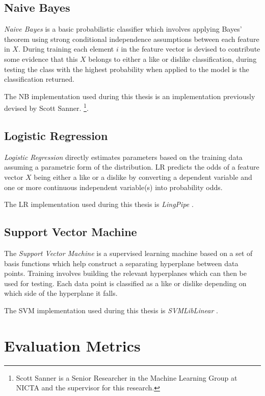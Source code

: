 \subsection{Naive Bayes}
\label{sec:nb}

\emph{Naive Bayes} is a basic probabilistic classifier which involves applying Bayes' theorem using strong conditional independence 
assumptions between each feature in $X$. During training each element $i$ in the feature vector is devised to contribute some 
evidence that this $X$ belongs to either a like or dislike classification, during testing the class with the highest probability 
when applied to the model is the classification returned. 

The NB implementation used during this thesis is an implementation previously devised by Scott Sanner.
\footnote{Scott Sanner is a Senior Researcher in the Machine Learning Group at NICTA and the supervisor for this research.}.

\subsection{Logistic Regression}
\label{sec:lr}

\emph{Logistic Regression} directly estimates parameters based on the training data assuming a parametric form of the distribution.
LR predicts the odds of a feature vector $X$ being either a like or a dislike by converting a dependent variable and 
one or more continuous independent variable(s) into probability odds.

The LR implementation used during this thesis is \emph{LingPipe} \cite{lin}.

\subsection{Support Vector Machine}
\label{sec:svm}

The \emph{Support Vector Machine} is a supervised learning machine based on a set of basis functions which help construct 
a separating hyperplane between data points. Training involves building the relevant hyperplanes which can then be used for testing. 
Each data point is classified as a like or dislike depending on which side of the hyperplane it falls.

The SVM implementation used during this thesis is \emph{SVMLibLinear} \cite{cjlin}.

\section{Evaluation Metrics}
\label{sec:notation}

